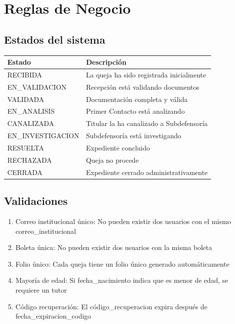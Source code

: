 \documentclass[11pt,letterpaper]{article}
\begin{document}
\section{Reglas de Negocio}

\subsection{Estados del sistema}
\begin{longtable}{|p{4cm}|p{9cm}|}
\hline
\rowcolor{lightgray} \textbf{Estado} & \textbf{Descripción} \\
\hline
RECIBIDA & La queja ha sido registrada inicialmente \\
\hline
EN\_VALIDACION & Recepción está validando documentos \\
\hline
VALIDADA & Documentación completa y válida \\
\hline
EN\_ANALISIS & Primer Contacto está analizando \\
\hline
CANALIZADA & Titular la ha canalizado a Subdefensoría \\
\hline
EN\_INVESTIGACION & Subdefensoría está investigando \\
\hline
RESUELTA & Expediente concluido \\
\hline
RECHAZADA & Queja no procede \\
\hline
CERRADA & Expediente cerrado administrativamente \\
\hline
\end{longtable}

\subsection{Validaciones}
\begin{enumerate}
\item Correo institucional único: No pueden existir dos usuarios con el mismo correo\_institucional
\item Boleta única: No pueden existir dos usuarios con la misma boleta
\item Folio único: Cada queja tiene un folio único generado automáticamente
\item Mayoría de edad: Si fecha\_nacimiento indica que es menor de edad, se requiere un tutor
\item Código recuperación: El código\_recuperacion expira después de fecha\_expiracion\_codigo
\end{enumerate}
\end{document}

